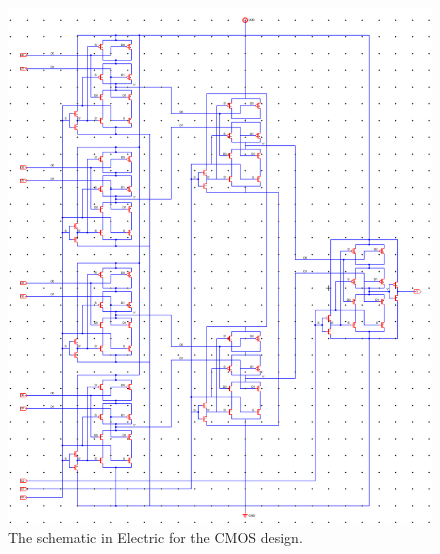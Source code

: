 \documentclass{article}
\begin{document}
    \begin{figure}[H]
      \centering
      \includegraphics[width=0.9\linewidth, frame]{screenshots/cmos/schem/schem1.png}
      \caption{The schematic in Electric for the CMOS design.}
      \label{fig:cmosschem1}
    \end{figure}
\end{document}
